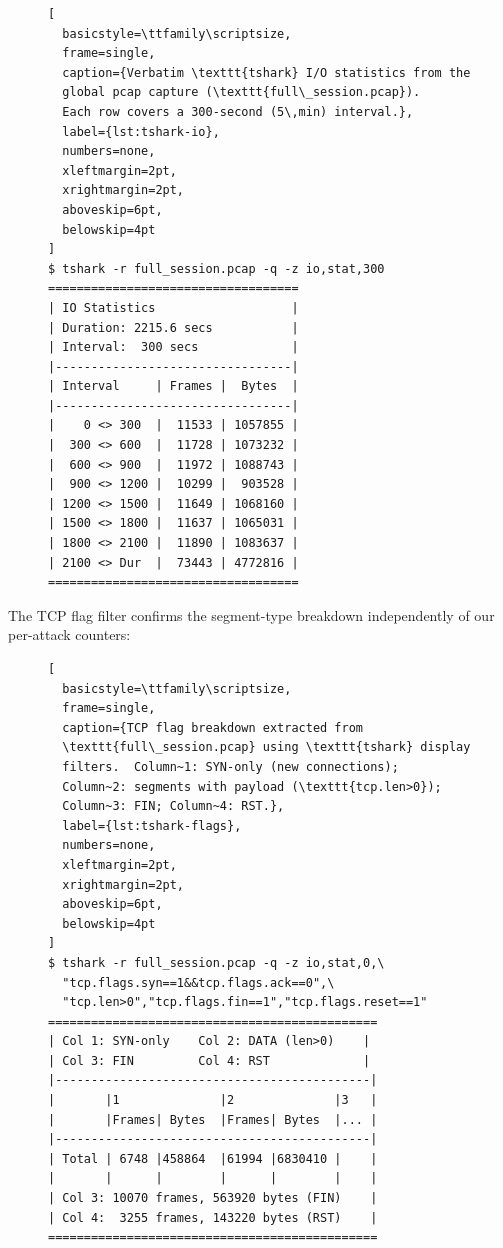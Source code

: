 \begin{figure}[t]
\begin{lstlisting}[
  basicstyle=\ttfamily\scriptsize,
  frame=single,
  caption={Verbatim \texttt{tshark} I/O statistics from the
  global pcap capture (\texttt{full\_session.pcap}).
  Each row covers a 300-second (5\,min) interval.},
  label={lst:tshark-io},
  numbers=none,
  xleftmargin=2pt,
  xrightmargin=2pt,
  aboveskip=6pt,
  belowskip=4pt
]
$ tshark -r full_session.pcap -q -z io,stat,300
===================================
| IO Statistics                   |
| Duration: 2215.6 secs           |
| Interval:  300 secs             |
|---------------------------------|
| Interval     | Frames |  Bytes  |
|---------------------------------|
|    0 <> 300  |  11533 | 1057855 |
|  300 <> 600  |  11728 | 1073232 |
|  600 <> 900  |  11972 | 1088743 |
|  900 <> 1200 |  10299 |  903528 |
| 1200 <> 1500 |  11649 | 1068160 |
| 1500 <> 1800 |  11637 | 1065031 |
| 1800 <> 2100 |  11890 | 1083637 |
| 2100 <> Dur  |  73443 | 4772816 |
===================================
\end{lstlisting}
\end{figure}

The TCP flag filter confirms the segment-type breakdown
independently of our per-attack counters:

\begin{figure}[t]
\begin{lstlisting}[
  basicstyle=\ttfamily\scriptsize,
  frame=single,
  caption={TCP flag breakdown extracted from
  \texttt{full\_session.pcap} using \texttt{tshark} display
  filters.  Column~1: SYN-only (new connections);
  Column~2: segments with payload (\texttt{tcp.len>0});
  Column~3: FIN; Column~4: RST.},
  label={lst:tshark-flags},
  numbers=none,
  xleftmargin=2pt,
  xrightmargin=2pt,
  aboveskip=6pt,
  belowskip=4pt
]
$ tshark -r full_session.pcap -q -z io,stat,0,\
  "tcp.flags.syn==1&&tcp.flags.ack==0",\
  "tcp.len>0","tcp.flags.fin==1","tcp.flags.reset==1"
==============================================
| Col 1: SYN-only    Col 2: DATA (len>0)    |
| Col 3: FIN         Col 4: RST             |
|--------------------------------------------|
|       |1              |2              |3   |
|       |Frames| Bytes  |Frames| Bytes  |... |
|--------------------------------------------|
| Total | 6748 |458864  |61994 |6830410 |    |
|       |      |        |      |        |    |
| Col 3: 10070 frames, 563920 bytes (FIN)    |
| Col 4:  3255 frames, 143220 bytes (RST)    |
==============================================
\end{lstlisting}
\end{figure}

